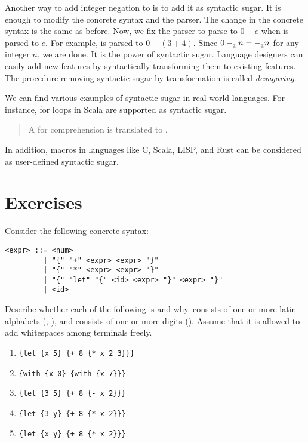 Another way to add integer negation to \lang is to add it as syntactic sugar. It
is enough to modify the concrete syntax and the parser. The change in the
concrete syntax is the same as before. Now, we fix the parser to parse  to $0-e$ when  is parsed to $e$. For example,
 is parsed to $0-(3+4)$. Since $0-_{{}_{\mathbb{Z}}} n=-_{{}_{\mathbb{Z}}} n$ for any integer
$n$, we are done. It is the power of syntactic sugar. Language designers can
easily add new features by syntactically transforming them to existing features.
The procedure removing syntactic sugar by transformation is called
\textit{desugaring}.

We can find various examples of syntactic sugar in real-world languages. For
instance, for loops in Scala are supported as syntactic sugar.

\begin{quote}
  A for comprehension  is translated to
  .
\end{quote}

In addition, macros in languages like C, Scala, LISP, and Rust can be considered
as user-defined syntactic sugar.

\section{Exercises}

\begin{exercise}

Consider the following concrete syntax:

\begin{verbatim}
<expr> ::= <num>
         | "{" "+" <expr> <expr> "}"
         | "{" "*" <expr> <expr> "}"
         | "{" "let" "{" <id> <expr> "}" <expr> "}"
         | <id>
\end{verbatim}

Describe whether each of the following is  and why.
 consists of one or more latin alphabets (, ), and
 consists of one or more digits ().
Assume that it is allowed to add whitespaces among terminals freely.

\begin{enumerate}
  \item \verb!{let {x 5} {+ 8 {* x 2 3}}}!
  \item \verb!{with {x 0} {with {x 7}}}!
  \item \verb!{let {3 5} {+ 8 {- x 2}}}!
  \item \verb!{let {3 y} {+ 8 {* x 2}}}!
  \item \verb!{let {x y} {+ 8 {* x 2}}}!
\end{enumerate}

\end{exercise}

